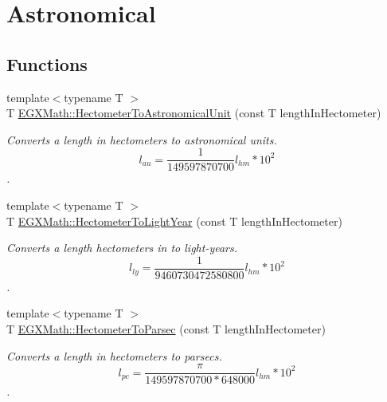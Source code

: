 \hypertarget{group___e_g_x_math-_conversions-_length_conversions-_hectometer-_astronomical}{}\section{Astronomical}
\label{group___e_g_x_math-_conversions-_length_conversions-_hectometer-_astronomical}
\subsection*{Functions}
\begin{DoxyCompactItemize}
\item 
{\footnotesize template$<$typename T $>$ }\\T \mbox{\hyperlink{group___e_g_x_math-_conversions-_length_conversions-_hectometer-_astronomical_gaf66d80d2e1aeac562f9a5b67626cc46f}{E\+G\+X\+Math\+::\+Hectometer\+To\+Astronomical\+Unit}} (const T length\+In\+Hectometer)
\begin{DoxyCompactList}\small\item\em Converts a length in hectometers to astronomical units. \[ l_{au}= \frac{1}{149597870700} l_{hm} * 10^{2} \]. \end{DoxyCompactList}\item 
{\footnotesize template$<$typename T $>$ }\\T \mbox{\hyperlink{group___e_g_x_math-_conversions-_length_conversions-_hectometer-_astronomical_ga71004aaba27ec49989b80e41e2075376}{E\+G\+X\+Math\+::\+Hectometer\+To\+Light\+Year}} (const T length\+In\+Hectometer)
\begin{DoxyCompactList}\small\item\em Converts a length hectometers in to light-\/years. \[ l_{ly}= \frac{1}{9460730472580800} l_{hm} * 10^{2} \]. \end{DoxyCompactList}\item 
{\footnotesize template$<$typename T $>$ }\\T \mbox{\hyperlink{group___e_g_x_math-_conversions-_length_conversions-_hectometer-_astronomical_gae327abefa3e19b130dfde5d8e1f4a4ab}{E\+G\+X\+Math\+::\+Hectometer\+To\+Parsec}} (const T length\+In\+Hectometer)
\begin{DoxyCompactList}\small\item\em Converts a length in hectometers to parsecs. \[ l_{pc}=\frac{\pi}{149597870700 * 648000} l_{hm} * 10^{2} \]. \end{DoxyCompactList}\end{DoxyCompactItemize}


